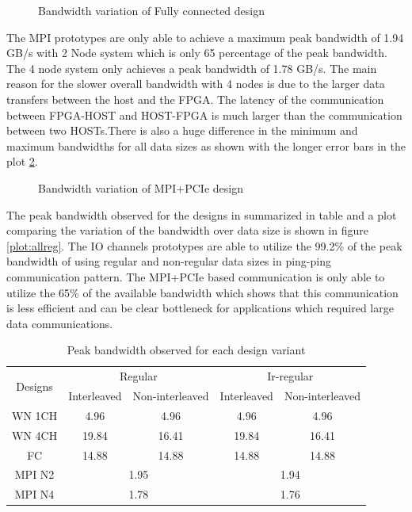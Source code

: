 \begin{figure}[ht]
    \centering
    \scalebox{0.8}{}
    \caption{Bandwidth variation of Fully connected design}
    \label{plot:fc}
\end{figure}


The MPI prototypes are only able to achieve a maximum peak bandwidth of 1.94 GB/s with 2 Node system
which is only 65 percentage of the peak bandwidth. The 4 node system only achieves a peak bandwidth of
1.78 GB/s. The main reason for the slower overall bandwidth with 4 nodes is due to the larger
data transfers between the host and the FPGA. The latency of the communication between FPGA-HOST
and HOST-FPGA is much larger than the communication between two HOSTs.There is also a huge difference
in the minimum and maximum bandwidths for all data sizes as shown with the longer error bars in the
plot \ref{plot:mpipcie}.

\begin{figure}[ht]
    \centering
    \scalebox{0.8}{}
    \caption{Bandwidth variation of MPI+PCIe design}
    \label{plot:mpipcie}
\end{figure}

The peak bandwidth observed for the designs in summarized in table and a plot comparing the variation
of the bandwidth over data size is shown in figure \ref{plot:allreg}. The IO channels prototypes are able
to utilize the 99.2\% of the peak bandwidth of using regular and non-regular data sizes in ping-ping
communication pattern. The MPI+PCIe based communication is only able to utilize the 65\% of the available
bandwidth which shows that this communication is less efficient and can be clear bottleneck for applications
which required large data communications.
\begin{table}[ht]
    \centering
    \begin{tabular}{ccccc}
    \multicolumn{1}{c}{\multirow{2}{*}{Designs}} & \multicolumn{2}{c}{Regular} & \multicolumn{2}{c}{Ir-regular} \\ \cline{2-5}
    \multicolumn{1}{c}{} & Interleaved & \multicolumn{1}{c}{Non-interleaved} & Interleaved & \multicolumn{1}{c}{Non-interleaved} \\ \hline
    WN 1CH & \multicolumn{1}{c}{4.96} & 4.96 & \multicolumn{1}{c}{4.96} & 4.96 \\ \hline
    WN 4CH & \multicolumn{1}{c}{19.84} & 16.41 & \multicolumn{1}{c}{19.84} & 16.41 \\ \hline
    FC & \multicolumn{1}{c}{14.88} & 14.88 & \multicolumn{1}{c}{14.88} & 14.88 \\ \hline
    MPI N2 & \multicolumn{2}{c}{1.95} & \multicolumn{2}{c}{1.94} \\ \hline
    MPI N4 & \multicolumn{2}{c}{1.78} & \multicolumn{2}{c}{1.76} \\ \hline
    \end{tabular}%
    \caption{Peak bandwidth observed for each design variant}
    \label{tab:obs_peakbw}
\end{table}


